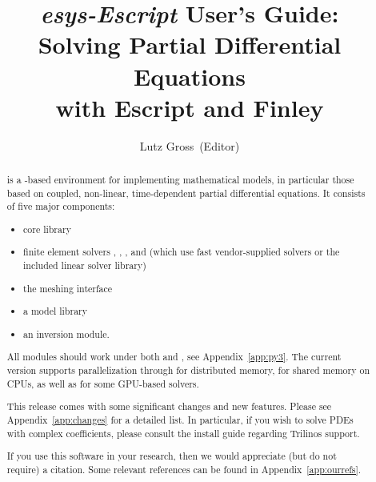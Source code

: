 \documentclass{esysdoc}
\title{\emph{esys-Escript} User's Guide:\\ Solving Partial Differential Equations\\ with Escript and Finley}
\author{Lutz Gross\etal~(Editor)}
\date{\reldate}
\begin{document}
\maketitle

\ifpdf
{}
\fi





\begin{abstract}%
\escript is a \PYTHON-based environment for implementing mathematical models, in particular those based on coupled, non-linear, time-dependent partial differential equations.
It consists of five major components:
\begin{itemize}
\item \escript core library
\item finite element solvers \finley, \dudley, \ripley, and \speckley (which
    use fast vendor-supplied solvers or the included \PASO linear solver library)
\item the meshing interface \pycad
\item a model library
\item an inversion module.
\end{itemize}

All \escript modules should work under both  and , see
Appendix~\ref{app:py3}.
The current version supports parallelization through \MPI for distributed
memory, \OPENMP for shared memory on CPUs, as well as \CUDA for some GPU-based
solvers.

This release comes with some significant changes and new features.
Please see Appendix~\ref{app:changes} for a detailed list.
In particular, if you wish to solve PDEs with complex coefficients, please consult the install guide regarding Trilinos support.

If you use this software in your research, then we would appreciate (but do not
require) a citation.
Some relevant references can be found in Appendix~\ref{app:ourrefs}.
\end{abstract}


\cleardoublepage{}%
\tableofcontents














\esysappendix %

%


\cleardoublepage
{}
{}
\printindex

\cleardoublepage
{}
{}


\end{document}
